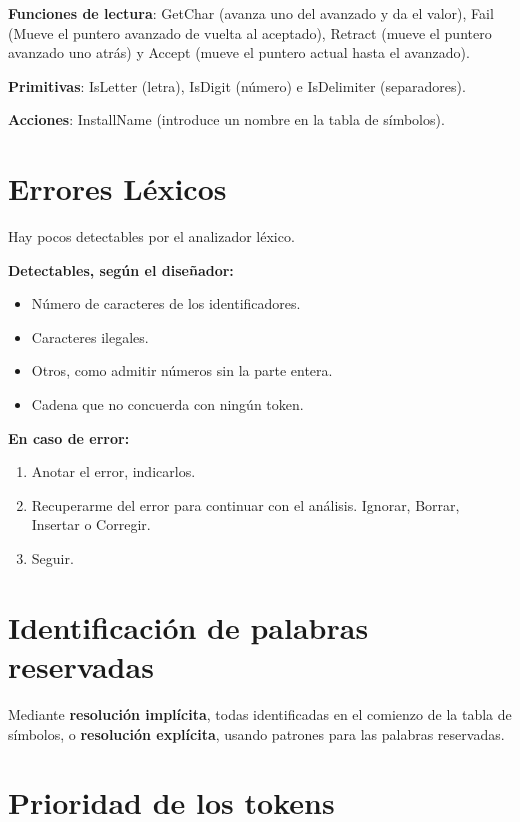 \documentclass[12pt, twoside, openright]{report} %
\begin{document}
\textbf{Funciones de lectura}: GetChar (avanza uno del avanzado y da el
valor), Fail (Mueve el puntero avanzado de vuelta al aceptado),
Retract (mueve el puntero avanzado uno atrás) y Accept (mueve el puntero
actual hasta el avanzado).

\textbf{Primitivas}: IsLetter (letra), IsDigit (número) e IsDelimiter (separadores).

\textbf{Acciones}: InstallName (introduce un nombre en la tabla de
símbolos).


\section{Errores Léxicos}

Hay pocos detectables por el analizador léxico.

\textbf{Detectables, según el diseñador:}

\begin{itemize}
	\item Número de caracteres de los identificadores.
	\item Caracteres ilegales.
	\item Otros, como admitir números sin la parte entera.
	\item Cadena que no concuerda con ningún token.
\end{itemize}

\textbf{En caso de error:}

\begin{enumerate}
	\def\labelenumi{\arabic{enumi}.}
	\item Anotar el error, indicarlos.
	\item Recuperarme del error para continuar con el análisis. Ignorar, Borrar,
	      Insertar o Corregir.
	\item Seguir.
\end{enumerate}


\section{Identificación de palabras reservadas}

Mediante \textbf{resolución implícita}, todas identificadas en el
comienzo de la tabla de símbolos, o \textbf{resolución explícita},
usando patrones para las palabras reservadas.


\section{Prioridad de los tokens}
\end{document}
